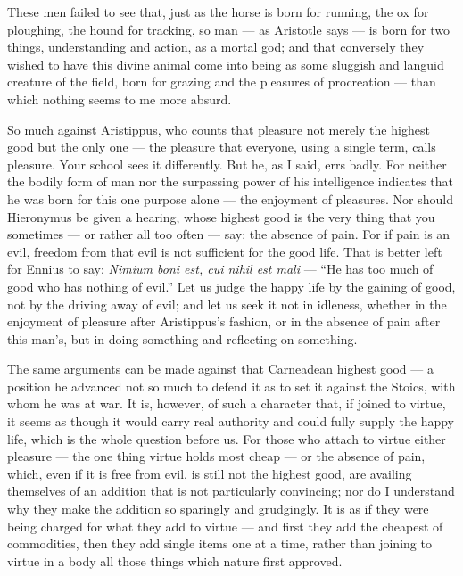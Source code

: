 These men failed to see that, just as the horse is born for running, the ox for ploughing, the hound for tracking, so man — as Aristotle says — is born for two things, understanding and action, as a mortal god; and that conversely they wished to have this divine animal come into being as some sluggish and languid creature of the field, born for grazing and the pleasures of procreation — than which nothing seems to me more absurd.

 So much against Aristippus, who counts that pleasure not merely the highest good but the only one — the pleasure that everyone, using a single term, calls pleasure. Your school sees it differently. But he, as I said, errs badly. For neither the bodily form of man nor the surpassing power of his intelligence indicates that he was born for this one purpose alone — the enjoyment of pleasures. Nor should Hieronymus be given a hearing, whose highest good is the very thing that you sometimes — or rather all too often — say: the absence of pain. For if pain is an evil, freedom from that evil is not sufficient for the good life. That is better left for Ennius to say: \textit{Nimium boni est, cui nihil est mali} — ``He has too much of good who has nothing of evil.'' Let us judge the happy life by the gaining of good, not by the driving away of evil; and let us seek it not in idleness, whether in the enjoyment of pleasure after Aristippus's fashion, or in the absence of pain after this man's, but in doing something and reflecting on something.

 The same arguments can be made against that Carneadean highest good — a position he advanced not so much to defend it as to set it against the Stoics, with whom he was at war. It is, however, of such a character that, if joined to virtue, it seems as though it would carry real authority and could fully supply the happy life, which is the whole question before us. For those who attach to virtue either pleasure — the one thing virtue holds most cheap — or the absence of pain, which, even if it is free from evil, is still not the highest good, are availing themselves of an addition that is not particularly convincing; nor do I understand why they make the addition so sparingly and grudgingly. It is as if they were being charged for what they add to virtue — and first they add the cheapest of commodities, then they add single items one at a time, rather than joining to virtue in a body all those things which nature first approved.

